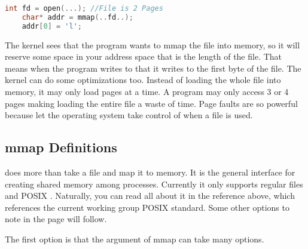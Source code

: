 \begin{lstlisting}[language=C]
	int fd = open(...); //File is 2 Pages
	char* addr = mmap(..fd..);
	addr[0] = 'l';
\end{lstlisting}
	 
The kernel sees that the program wants to mmap the file into memory, so it will reserve some space in your address space that is the length of the file.
That means when the program writes to  that it writes to the first byte of the file.
The kernel can do some optimizations too.
Instead of loading the whole file into memory, it may only load pages at a time.
A program may only access 3 or 4 pages making loading the entire file a waste of time.
Page faults are so powerful because let the operating system take control of when a file is used.
	 
\subsection{mmap Definitions}
	 
 does more than take a file and map it to memory.
It is the general interface for creating shared memory among processes.
Currently it only supports regular files and POSIX  \cite{mmap_2018}.
Naturally, you can read all about it in the reference above, which references the current working group POSIX standard.
Some other options to note in the page will follow.
	 
The first option is that the  argument of mmap can take many options.
	 
